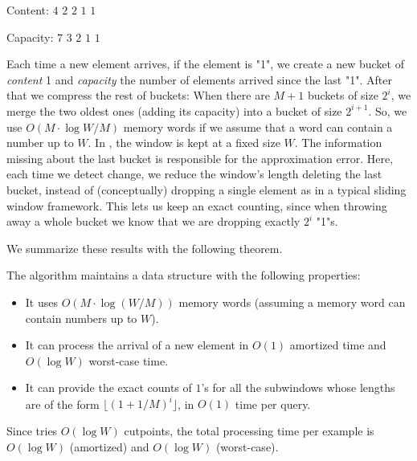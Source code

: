 \nopagebreak
Content: \hspace{.2pt} $4$ \hspace{10pt} $2$ \hspace{10pt} $2$ \hspace{6pt} $1$ \hspace{3pt} $1$
\smallskip

\nopagebreak
Capacity:  $7$ \hspace{10pt} $3$ \hspace{10pt} $2$ \hspace{6pt} $1$ \hspace{3pt} $1$
\medskip

\noindent
Each time a new element arrives, 
if the element is "1", we create a new bucket of {\em content} 1 and {\em capacity}
the number of elements arrived since the last "1". 
After that we compress the rest of buckets: When there are $M+1$ buckets of size $2^i$, 
we merge the two oldest ones (adding its capacity) into a bucket of size $2^{i+1}$. 
So, we use %
$O(M \cdot\log W/M)$ memory words if we assume that a word can contain a number up to $W$. 
In \cite{datar02}, the window is kept at a fixed size $W$. The information missing
about the last bucket is responsible for the approximation error. 
Here, each time we detect change, we reduce the window's length deleting the last bucket, 
instead of (conceptually) dropping a single element as in a typical sliding window framework.
This lets us keep an exact counting, since when throwing away a whole bucket 
we know that we are dropping exactly $2^i$ "1"s.

We summarize these results with the following theorem.

\begin{theorem}
The \adwintwo algorithm maintains a data structure with the following properties: 
\label{ThAdwin2}
\begin{itemize}
\item 
It uses $O(M \cdot \log (W/M))$ memory words
(assuming a memory word can contain numbers up to $W$). 
\item 
It can process the arrival of a new element in $O(1)$ amortized time 
and $O(\log W)$ worst-case time.
\item 
It can provide the exact counts of $1$'s
for all the subwindows whose lengths are of the form 
$\lfloor(1+1/M)^i\rfloor$, in $O(1)$ time per query.
\end{itemize}
\end{theorem}
%
Since \adwintwo tries $O(\log W)$ cutpoints,
the total processing time per example is $O(\log W)$ (amortized) 
and $O(\log W)$ (worst-case). 

